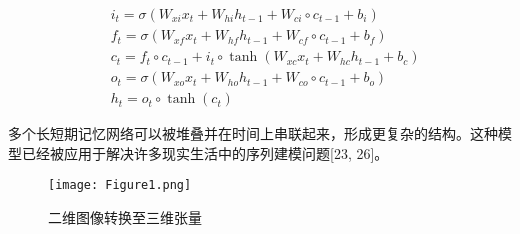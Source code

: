 \begin{equation}
  \begin{split}
    & i_t=\sigma(W_{xi}x_t+W_{hi}h_{t-1}+W_{ci}\circ c_{t-1}+b_i)\\
    & f_t=\sigma(W_{xf}x_t+W_{hf}h_{t-1}+W_{cf}\circ c_{t-1}+b_f)\\
    & c_t=f_t\circ c_{t-1}+i_t\circ \tanh(W_{xc}x_t+W_{hc}h_{t-1}+b_c)\\
    & o_t=\sigma(W_{xo}x_t+W_{ho}h_{t-1}+W_{co}\circ c_{t-1}+b_o)\\
    & h_t=o_t\circ \tanh(c_t)\label{EqT2}
  \end{split}
\end{equation}

\par 多个长短期记忆网络可以被堆叠并在时间上串联起来，形成更复杂的结构。这种模型已经被应用于解决许多现实生活中的序列建模问题[23, 26]。

\begin{figure}
  \begin{center}
    \texttt{[image: Figure1.png]}
    \caption{二维图像转换至三维张量}
    \label{FigT1}
  \end{center}
\end{figure}
